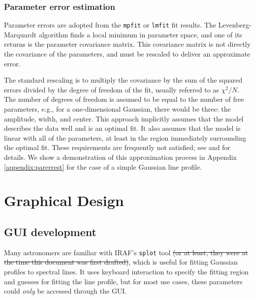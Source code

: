\documentclass[twocolumn]{aastex63}
\newcommand{\pyspeckit}{\texttt{pyspeckit}\xspace}
\begin{document}
\subsubsection{Parameter error estimation}
\label{sec:parerrest}
Parameter errors are adopted from the \texttt{mpfit} or \texttt{lmfit} fit
results.  The Levenberg-Marquardt algorithm finds a local minimum in parameter
space, and one of its returns is the parameter covariance matrix.  This
covariance matrix is not directly the covariance of the parameters, and must be
rescaled to deliver an approximate error.

The standard rescaling is to multiply the covariance by the sum of the squared
errors divided by the degree of freedom of the fit, usually referred to
as $\chi^2/N$.  The number of degrees of freedom is assumed to be equal to the
number of free parameters, e.g., for a one-dimensional Gaussian, there would be
three: the amplitude, width, and center.  This approach implicitly assumes that
the
model describes the data well and is an optimal fit.  It also assumes that
the model is linear with all of the parameters, at least in the region immediately
surrounding the optimal fit.  These requirements are frequently not satisfied;
see \citet{Andrae2010a} and \citet{Andrae2010b} for details.
We show a demonstration of this approximation process in Appendix \ref{appendix:parerrest}
for the case of a simple Gaussian line profile.




\section{Graphical Design}
\label{sec:gui}
\subsection{GUI development}
Many astronomers are familiar with IRAF's \texttt{splot} tool \sout{(or at least, they were at
the time this document was first drafted)}, which is useful
for fitting Gaussian profiles to spectral lines.  It uses keyboard interaction
to specify the fitting region and guesses for fitting the line profile, but for
most use cases, these parameters could \emph{only} be accessed through the GUI.
\end{document}
